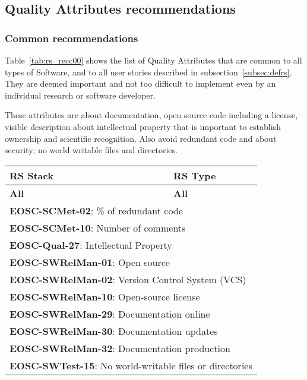 \subsection{Quality Attributes recommendations}

\subsubsection{Common recommendations}

Table~\ref{tab:rs_recc00} shows the list of Quality Attributes that are common to all types of Software, and to all user stories described in subsection~\ref{subsec:defrs}. They are deemed important and not too difficult to implement even by an individual research or software developer.

These attributes are about documentation, open source code including a license, visible description about intellectual property that is important to establish ownership and scientific recognition. Also avoid redundant code and about security; no world writable files and directories.

\begin{center}
  \label{tab:rs_recc00}
  \small
  \begin{tabular}{|p{0.65\linewidth}|p{0.35\linewidth}|} \hline

    \textbf{RS Stack} & \textbf{RS Type} \\ \hline \hline
    \textbf{All} &
    \textbf{All} \\ \hline \hline
    \multicolumn{2}{|l|}{\textbf{EOSC-SCMet-02}: \% of redundant code} \\ \hline
    \multicolumn{2}{|l|}{\textbf{EOSC-SCMet-10}: Number of comments} \\ \hline
    \multicolumn{2}{|l|}{\textbf{EOSC-Qual-27}: Intellectual Property} \\ \hline
    \multicolumn{2}{|l|}{\textbf{EOSC-SWRelMan-01}: Open source} \\ \hline
    \multicolumn{2}{|l|}{\textbf{EOSC-SWRelMan-02}: Version Control System (VCS)} \\ \hline
    \multicolumn{2}{|l|}{\textbf{EOSC-SWRelMan-10}: Open-source license} \\ \hline
    \multicolumn{2}{|l|}{\textbf{EOSC-SWRelMan-29}: Documentation online} \\ \hline
    \multicolumn{2}{|l|}{\textbf{EOSC-SWRelMan-30}: Documentation updates} \\ \hline
    \multicolumn{2}{|l|}{\textbf{EOSC-SWRelMan-32}: Documentation production} \\ \hline
    \multicolumn{2}{|l|}{\textbf{EOSC-SWTest-15}: No world-writable files or directories} \\ \hline

  \end{tabular}
\end{center}


